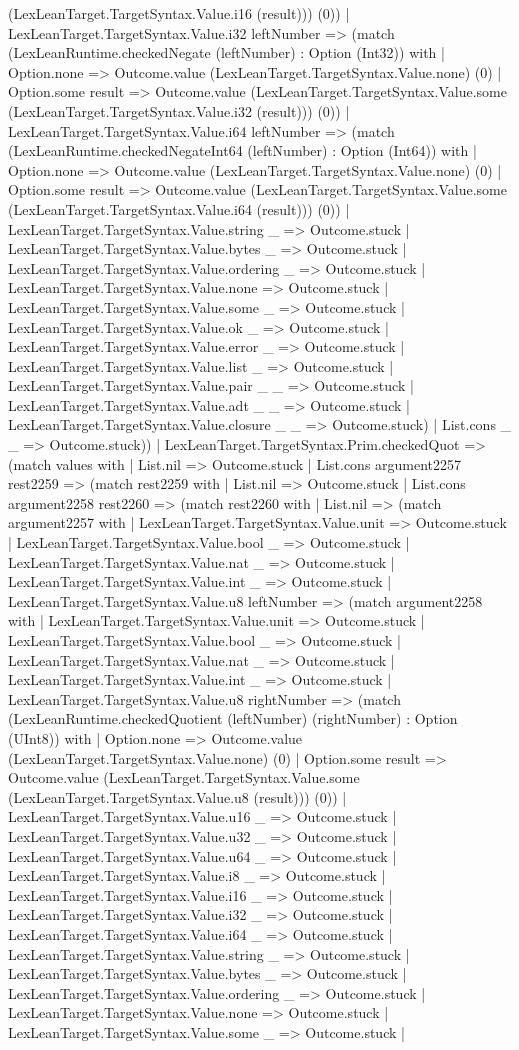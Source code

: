 \documentclass[11pt]{article}
\begin{document}
(LexLeanTarget.TargetSyntax.Value.i16 (result))) (0)) | LexLeanTarget.TargetSyntax.Value.i32 leftNumber => (match (LexLeanRuntime.checkedNegate (leftNumber) : Option (Int32)) with | Option.none => Outcome.value (LexLeanTarget.TargetSyntax.Value.none) (0) | Option.some result => Outcome.value (LexLeanTarget.TargetSyntax.Value.some (LexLeanTarget.TargetSyntax.Value.i32 (result))) (0)) | LexLeanTarget.TargetSyntax.Value.i64 leftNumber => (match (LexLeanRuntime.checkedNegateInt64 (leftNumber) : Option (Int64)) with | Option.none => Outcome.value (LexLeanTarget.TargetSyntax.Value.none) (0) | Option.some result => Outcome.value (LexLeanTarget.TargetSyntax.Value.some (LexLeanTarget.TargetSyntax.Value.i64 (result))) (0)) | LexLeanTarget.TargetSyntax.Value.string \_ => Outcome.stuck | LexLeanTarget.TargetSyntax.Value.bytes \_ => Outcome.stuck | LexLeanTarget.TargetSyntax.Value.ordering \_ => Outcome.stuck | LexLeanTarget.TargetSyntax.Value.none => Outcome.stuck | LexLeanTarget.TargetSyntax.Value.some \_ => Outcome.stuck | LexLeanTarget.TargetSyntax.Value.ok \_ => Outcome.stuck | LexLeanTarget.TargetSyntax.Value.error \_ => Outcome.stuck | LexLeanTarget.TargetSyntax.Value.list \_ => Outcome.stuck | LexLeanTarget.TargetSyntax.Value.pair \_ \_ => Outcome.stuck | LexLeanTarget.TargetSyntax.Value.adt \_ \_ => Outcome.stuck | LexLeanTarget.TargetSyntax.Value.closure \_ \_ => Outcome.stuck) | List.cons \_ \_ => Outcome.stuck)) | LexLeanTarget.TargetSyntax.Prim.checkedQuot => (match values with | List.nil => Outcome.stuck | List.cons argument2257 rest2259 => (match rest2259 with | List.nil => Outcome.stuck | List.cons argument2258 rest2260 => (match rest2260 with | List.nil => (match argument2257 with | LexLeanTarget.TargetSyntax.Value.unit => Outcome.stuck | LexLeanTarget.TargetSyntax.Value.bool \_ => Outcome.stuck | LexLeanTarget.TargetSyntax.Value.nat \_ => Outcome.stuck | LexLeanTarget.TargetSyntax.Value.int \_ => Outcome.stuck | LexLeanTarget.TargetSyntax.Value.u8 leftNumber => (match argument2258 with | LexLeanTarget.TargetSyntax.Value.unit => Outcome.stuck | LexLeanTarget.TargetSyntax.Value.bool \_ => Outcome.stuck | LexLeanTarget.TargetSyntax.Value.nat \_ => Outcome.stuck | LexLeanTarget.TargetSyntax.Value.int \_ => Outcome.stuck | LexLeanTarget.TargetSyntax.Value.u8 rightNumber => (match (LexLeanRuntime.checkedQuotient (leftNumber) (rightNumber) : Option (UInt8)) with | Option.none => Outcome.value (LexLeanTarget.TargetSyntax.Value.none) (0) | Option.some result => Outcome.value (LexLeanTarget.TargetSyntax.Value.some (LexLeanTarget.TargetSyntax.Value.u8 (result))) (0)) | LexLeanTarget.TargetSyntax.Value.u16 \_ => Outcome.stuck | LexLeanTarget.TargetSyntax.Value.u32 \_ => Outcome.stuck | LexLeanTarget.TargetSyntax.Value.u64 \_ => Outcome.stuck | LexLeanTarget.TargetSyntax.Value.i8 \_ => Outcome.stuck | LexLeanTarget.TargetSyntax.Value.i16 \_ => Outcome.stuck | LexLeanTarget.TargetSyntax.Value.i32 \_ => Outcome.stuck | LexLeanTarget.TargetSyntax.Value.i64 \_ => Outcome.stuck | LexLeanTarget.TargetSyntax.Value.string \_ => Outcome.stuck | LexLeanTarget.TargetSyntax.Value.bytes \_ => Outcome.stuck | LexLeanTarget.TargetSyntax.Value.ordering \_ => Outcome.stuck | LexLeanTarget.TargetSyntax.Value.none => Outcome.stuck | LexLeanTarget.TargetSyntax.Value.some \_ => Outcome.stuck | 
\end{document}
